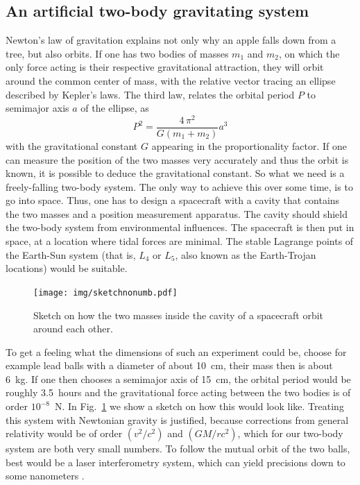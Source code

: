 \documentclass[onecolumn]{aa} %
\begin{document}
\subsection{An artificial two-body gravitating system}
Newton's law of gravitation explains not only why an apple falls down
from a tree, but also orbits. If one has two bodies of masses $m_1$
and $m_2$, on which the only force acting is their respective
gravitational attraction, they will orbit around the common center of
mass, with the relative vector tracing an ellipse described by
Kepler's laws. The third law, relates the orbital period $P$ to
semimajor axis $a$ of the ellipse, as
\begin{equation}\label{eq:kepler3}
P^2 = \frac{4 \, \pi^2}{G(m_1+m_2)}a^3
\end{equation}
with the gravitational constant $G$ appearing in the proportionality
factor.  If one can measure the position of the two masses very
accurately and thus the orbit is known, it is possible to deduce the
gravitational constant.  So what we need is a freely-falling two-body
system. The only way to achieve this over some time, is to go into
space. Thus, one has to design a spacecraft with a cavity that
contains the two masses and a position measurement apparatus. The
cavity should shield the two-body system from environmental
influences. The spacecraft is then put in space, at a location where
tidal forces are minimal.  The stable Lagrange points of the Earth-Sun
system (that is, $L_4$ or $L_5$, also known as the Earth-Trojan
locations) would be suitable.

\begin{figure}
	\centering
	\texttt{[image: img/sketchnonumb.pdf]}
	\caption{Sketch on how the two masses inside the cavity of a spacecraft orbit around each other.}
	\label{fig:sketch}
\end{figure}

To get a feeling what the dimensions of such an experiment could be,
choose for example lead balls with a diameter of about 10~cm, their
mass then is about 6~kg. If one then chooses a semimajor axis of
15~cm, the orbital period would be roughly 3.5~hours and the
gravitational force acting between the two bodies is of order
$10^{-8}$~N.  In Fig.~\ref{fig:sketch} we show a sketch on how this
would look like. Treating this system with Newtonian gravity is justified, because corrections from general relativity would be of order $(v^2/c^2)$ and $(GM/rc^2)$, which for our two-body system are both very small numbers. To follow the mutual orbit of the two balls, best
would be a laser interferometry system, which can yield precisions
down to some nanometers \citep{Loughridge13}.
\end{document}

